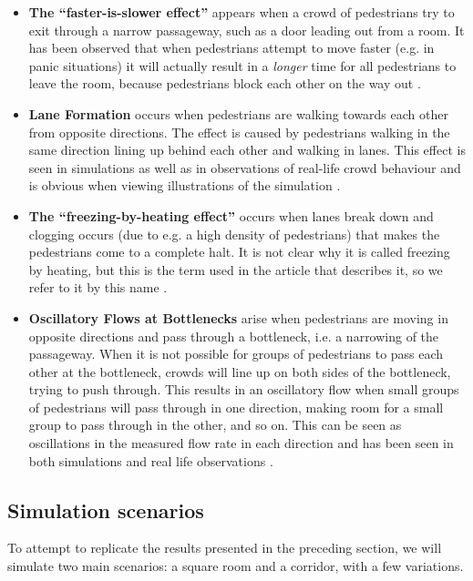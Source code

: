 \begin{itemize}
    \item \textbf{The ``faster-is-slower effect''}  appears when a crowd of 
        pedestrians try to exit through a narrow passageway, such as a door 
        leading out from a room. It has been observed that when pedestrians 
        attempt to move faster (e.g. in panic situations) it will actually 
        result in a \emph{longer} time for all pedestrians to leave the room, 
        because pedestrians block each other on the way out \cite{helbing00}.

    \item \textbf{Lane Formation} occurs when pedestrians are walking towards 
        each other from opposite directions. The effect is caused by 
        pedestrians walking in the same direction lining up behind each other 
        and walking in lanes. This effect is seen in simulations as well as in 
        observations of real-life crowd behaviour and is obvious when viewing 
        illustrations of the simulation \cite{self-org}.
        
    \item \textbf{The ``freezing-by-heating effect''} occurs when lanes break 
        down and clogging occurs (due to e.g. a high density of pedestrians) 
        that makes the pedestrians come to a complete halt. It is not clear 
        why it is called freezing by heating, but this is the term used in the 
        article that describes it, so we refer to it by this name 
        \cite{self-org}.
        
    \item \textbf{Oscillatory Flows at Bottlenecks} arise when pedestrians are 
        moving in opposite directions and pass through a bottleneck, i.e.  a 
        narrowing of the passageway.  When it is not possible for groups of 
        pedestrians to pass each other at the bottleneck, crowds will line up 
        on both sides of the bottleneck, trying to push through. This results 
        in an oscillatory flow when small groups of pedestrians will pass 
        through in one direction, making room for a small group to pass 
        through in the other, and so on.  This can be seen as oscillations in 
        the measured flow rate in each direction and has been seen in both 
        simulations and real life observations \cite{self-org}.
\end{itemize}

\subsection{Simulation scenarios}
\label{sec:scenario-presentation}
To attempt to replicate the results presented in the preceding section, we 
will simulate two main scenarios: a square room and a corridor, with a few 
variations.

